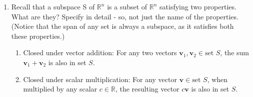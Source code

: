 \documentclass[12pt]{article}
\begin{document}
\begin{enumerate}
\begin{enumerate}
\[\begin{array}{rcl}
                            \mathbf{v}_4 & = & 2\mathbf{u}_1 + \sqrt{3}\mathbf{u}_2 + 0\mathbf{u}_3 + 0\mathbf{u}_4 + 0\mathbf{u}_5,                                                            \\[6pt]
                            \mathbf{v}_5 & = & \tfrac{1}{2}\mathbf{u}_1 + 0\mathbf{u}_2 + \tfrac{\sqrt{3}}{2}\mathbf{u}_3  + 0\mathbf{u}_4 + 0\mathbf{u}_5,                                     \\[6pt]
                            \mathbf{v}_6 & = & \tfrac{1}{2}\mathbf{u}_1 + \tfrac{2\sqrt{3}}{3}\mathbf{u}_2 - \tfrac{\sqrt{3}}{6}\mathbf{u}_3 + \tfrac{\sqrt{3}}{3}\mathbf{u}_4 + 0\mathbf{u}_5, \\[6pt]
                            \mathbf{v}_7 & = & \tfrac{1}{2}\mathbf{u}_1 + \tfrac{\sqrt{3}}{3}\mathbf{u}_2 - \tfrac{\sqrt{3}}{6}\mathbf{u}_3 + 0\mathbf{u}_4 + \tfrac{\sqrt{3}}{3}\mathbf{u}_5.
                        \end{array}
                    \]


              \item{}
                    If the input sequence is reversed, we do not expect the same output sequence.
                    This is because if Gran-Schmidt is applied to a set a vectors in a different order, you may get a different set of pivotal vectors, and therefore the orthonormal basis that you end up with will also be different.
                    However, the span of the orthonormal basis will always be the same, in this case spanning all of $\mathbb{R}^5$, no matter the order you applied Gram–Schmidt.

          \end{enumerate}

          \vspace{1em}

    \item{}  Recall that a subspace S of $\mathbb{R}^n$ is a subset of $\mathbb{R}^n$ satisfying two properties. What are they? Specify in detail - so, not just the
          name of the properties. (Notice that the span of any set is always a subspace, as it satisfies both these properties.)
          \begin{enumerate}
              \item{} Closed under vector addition: For any two vectors \(\mathbf{v}_1, \mathbf{v}_2 \in \text{set } S\), the sum \(\mathbf{v}_1 + \mathbf{v}_2\) is also in set \(S\).
              \item{} Closed under scalar multiplication: For any vector \(\mathbf{v} \in \text{set } S\), when multiplied by any scalar \(c \in \mathbb{R}\), the resulting vector \(c\mathbf{v}\) is also in set \(S\).
          \end{enumerate}


\end{enumerate}
\end{document}
